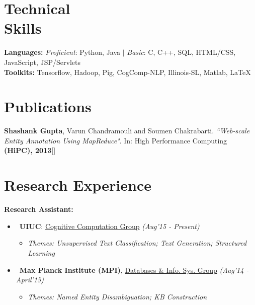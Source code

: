 \documentclass[margin,line]{templates/resume}
\newcommand{\myhref}[3][blue]{\href{#2}{\color{#1}{#3}}}
\newcommand{\compresslist}{%
\setlength{\itemsep}{3pt}%
\setlength{\parskip}{0pt}%
\setlength{\parsep}{0pt}%
}
\begin{document}
\begin{resume}
\vspace{-0.1cm}    
\section{\mysidestyle Technical\\ Skills}
\textbf{Languages:} \textit{Proficient}: Python, Java $|$ \textit{Basic}: C, C++, SQL, HTML/CSS, JavaScript, JSP/Servlets \\
\textbf{Toolkits:} Tensorflow, Hadoop, Pig, CogComp-NLP, Illinois-SL, Matlab, LaTeX

\vspace{-0.1cm}
\section{\mysidestyle Publications}
\vspace{0mm}
\textbf{Shashank Gupta}, Varun Chandramouli and Soumen Chakrabarti. \textit{``Web-scale Entity Annotation Using MapReduce"}. In: High Performance Computing \textbf{(HiPC), 2013}\hfill{[\myhref[darkblue]{https://shatu.github.io/papers/Web-scale_Entity_Annotation_Using_MapReduce.pdf}{PDF}]}

\vspace{-0.1cm}
\section{\mysidestyle Research Experience} 
\textsf{\textbf{Research Assistant:}}
\begin{itemize}[leftmargin = 0.7cm]\compresslist
\item~\textbf{UIUC}: \href{http://cogcomp.org/}{Cognitive Computation Group} \hfill{\small\textit{(Aug'15 - Present)}} \vspace{-1mm}
\begin{itemize}[leftmargin=*]\compresslist
        \item[]\small\textit{Themes: Unsupervised Text Classification; Text Generation; Structured Learning}
    \end{itemize}
  
\item~\textbf{Max Planck Institute (MPI)}, \href{https://www.mpi-inf.mpg.de/departments/databases-and-information-systems/}{Databases \& Info. Sys. Group}  \hfill{\small\textit{(Aug'14 - April'15)}}
\vspace{-1mm}
\begin{itemize}[leftmargin=*]\compresslist
        \item[]\small\textit{Themes: Named Entity Disambiguation; KB Construction}
    \end{itemize}


\end{itemize}
\end{resume}
\end{document}
